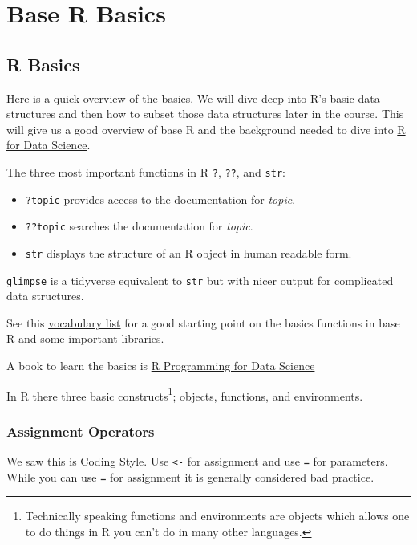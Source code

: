 \documentclass[]{book}
\providecommand{\tightlist}{%
  \setlength{\itemsep}{0pt}\setlength{\parskip}{0pt}}
\let\rmarkdownfootnote\footnote%
\def\footnote{\protect\rmarkdownfootnote}
\let\BeginKnitrBlock\begin \let\EndKnitrBlock\end
\begin{document}
\part{Base R Basics}\label{part-base-r-basics}

\chapter{R Basics}\label{baser-rbasics}

Here is a quick overview of the basics. We will dive deep into R's basic
data structures and then how to subset those data structures later in
the course. This will give us a good overview of base R and the
background needed to dive into \href{http://r4ds.had.co.nz/index.html}{R
for Data Science}.

The three most important functions in R \texttt{?}, \texttt{??}, and
\texttt{str}:

\begin{itemize}
\tightlist
\item
  \texttt{?topic} provides access to the documentation for \emph{topic}.
\item
  \texttt{??topic} searches the documentation for \emph{topic}.
\item
  \texttt{str} displays the structure of an R object in human readable
  form.
\end{itemize}

\BeginKnitrBlock{rmdtip}
\texttt{glimpse} is a tidyverse equivalent to \texttt{str} but with
nicer output for complicated data structures.
\EndKnitrBlock{rmdtip}

See this \href{http://adv-r.had.co.nz/Vocabulary.html}{vocabulary list}
for a good starting point on the basics functions in base R and some
important libraries.

A book to learn the basics is
\href{https://bookdown.org/rdpeng/rprogdatascience/}{R Programming for
Data Science}

In R there three basic constructs\footnote{Technically speaking
  functions and environments are objects which allows one to do things
  in R you can't do in many other languages.}; objects, functions, and
environments.

\section{Assignment Operators}\label{assignment-operators}

We saw this is Coding Style. Use \texttt{\textless{}-} for assignment
and use \texttt{=} for parameters. While you can use \texttt{=} for
assignment it is generally considered bad practice.
\end{document}

